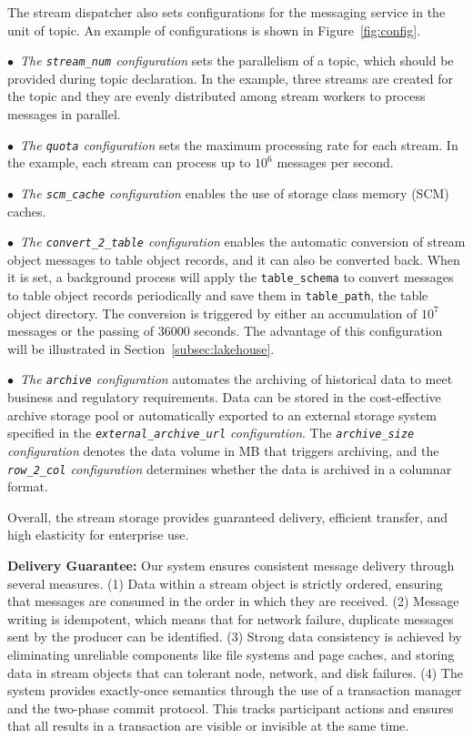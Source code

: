 The stream dispatcher also sets configurations for the messaging service in the unit of topic. An example of  configurations is shown in Figure~\ref{fig:config}.



$\bullet$~\textit{The \texttt{stream\_num} configuration} sets the parallelism of a topic, which should be provided during topic declaration. In the example, three streams are created for the topic and they are evenly distributed among stream workers to process messages in parallel.

$\bullet$~\textit{The \texttt{quota} configuration} sets the maximum processing rate for each stream. In the example, each stream can process up to $10^6$ messages per second.

$\bullet$~\textit{The \texttt{scm\_cache} configuration} enables the use of storage class memory (SCM) caches.

$\bullet$~\textit{The \texttt{convert\_2\_table} configuration} enables the automatic conversion of stream object messages to table object records, and it can also be converted back. When it is set, a background process will apply the \texttt{table\_schema} to convert messages to table object records periodically and save them in \texttt{table\_path}, \ie the table object directory. The conversion is triggered by either an accumulation of $10^7$ messages or the passing of 36000 seconds.  The advantage of this configuration will be illustrated in Section~\ref{subsec:lakehouse}.





$\bullet$~\textit{The \texttt{archive} configuration} automates the archiving of historical data to meet business and regulatory requirements. Data can be stored in the cost-effective \sys archive storage pool or automatically exported to an external storage system specified in the \textit{\texttt{external\_archive\_url} configuration}. The \textit{\texttt{archive\_size} configuration} denotes the data volume in MB that triggers archiving, and the \textit{\texttt{row\_2\_col} configuration} determines whether the data is archived in a columnar format. 

Overall, the \sys stream storage provides guaranteed delivery, efficient transfer, and high elasticity for enterprise use.

\noindent\textbf{Delivery Guarantee:} Our system ensures consistent message delivery through several measures. (1) Data within a stream object is strictly ordered, ensuring that messages are consumed in the order in which they are received. (2) Message writing is idempotent, which means that for network failure, duplicate messages sent by the producer  can be identified.
 (3) Strong data consistency is achieved by eliminating unreliable components like file systems and page caches, and storing data in  stream objects that can tolerant node, network, and disk failures. (4) The system provides exactly-once semantics through the use of a transaction manager and the two-phase commit protocol. This tracks participant actions and ensures that all results in a transaction are visible or invisible at the same time.
 
